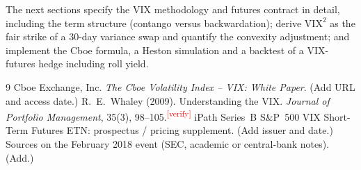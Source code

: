 \documentclass[11pt,a4paper]{article}
\newcommand{\verify}[1][]{\textcolor{red}{\textsuperscript{[verify#1]}}}
\newcommand{\VIX}{\mathrm{VIX}}
\begin{document}
The next sections specify the VIX methodology and futures contract in detail, including the term structure (contango versus backwardation); derive $\VIX^2$ as the fair strike of a 30-day variance swap and quantify the convexity adjustment; and implement the Cboe formula, a Heston simulation and a backtest of a VIX-futures hedge including roll yield.

\begin{thebibliography}{9}
 Cboe Exchange, Inc. \emph{The Cboe Volatility Index -- VIX: White Paper}. (Add URL and access date.)
 R.~E.~Whaley (2009). Understanding the VIX. \emph{Journal of Portfolio Management}, 35(3), 98--105.\verify
{} iPath Series~B S\&P~500 VIX Short-Term Futures ETN: prospectus / pricing supplement. (Add issuer and date.)
 Sources on the February 2018 event (SEC, academic or central-bank notes). (Add.)
\end{thebibliography}
\end{document}

